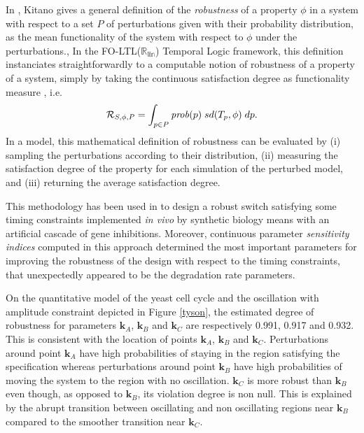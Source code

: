 \documentclass[graybox]{svmult}
\newcommand{\vct}[1]{\bm{#1}}
\newcommand{\pprob}{\mathit{prob}}
\def\Rob{{\cal R}}
\def\Rlin{\mathbb{R_{\mbox{lin}}}}
\begin{document}
In \cite{Kitano07msb}, Kitano gives a general definition
of the \emph{robustness} of a property $\phi$
in a system with respect to a set $P$ of perturbations given with their probability distribution,
as the mean functionality of the system with respect to $\phi$ under the perturbations.,
In the FO-LTL($\Rlin$) Temporal Logic framework, this definition instanciates straightforwardly
to a computable notion of robustness of a property of a system,
simply by taking the continuous satisfaction degree as functionality measure \cite{RBFS09bi}, i.e.
$$\Rob_{S,\phi,P}=\int_{p\in P} \pprob(p)\; sd(T_p,\phi)\; dp.$$
In a model, this mathematical definition of robustness can be evaluated by 
(i) sampling the perturbations according to their distribution,
(ii) measuring the satisfaction degree of the property
for each simulation of the perturbed model,
 and (iii) returning the average satisfaction degree.

This methodology has been used in \cite{BYWB07bi} to design 
a robust switch satisfying some timing constraints
implemented \emph{in vivo} by synthetic biology means with an artificial cascade of gene inhibitions.
Moreover, continuous parameter \emph{sensitivity indices} computed in this approach
determined the most important parameters for improving the robustness of the design with respect to the timing constraints,
that unexpectedly appeared to be the degradation rate parameters.


On the quantitative model of the yeast cell cycle \cite{Tyson91pnas}
and the oscillation with amplitude constraint depicted in Figure \ref{tyson},
the estimated degree of robustness for parameters $\vct{k}_A$, $\vct{k}_B$ and $\vct{k}_C$
 are respectively 0.991, 0.917 and 0.932. This is consistent with the location 
of points $\vct{k}_A$, $\vct{k}_B$ and $\vct{k}_C$.
Perturbations around point $\vct{k}_A$  have high probabilities of staying in the region satisfying the specification whereas perturbations around point $\vct{k}_B$  have high probabilities of moving the system to the region with no oscillation. $\vct{k}_C$ is more robust than $\vct{k}_B$ even though, as opposed to $\vct{k}_B$, its violation degree is non null. This is explained by the abrupt transition between oscillating and non oscillating regions near $\vct{k}_B$ compared to the smoother
transition near $\vct{k}_C$.
\end{document}
